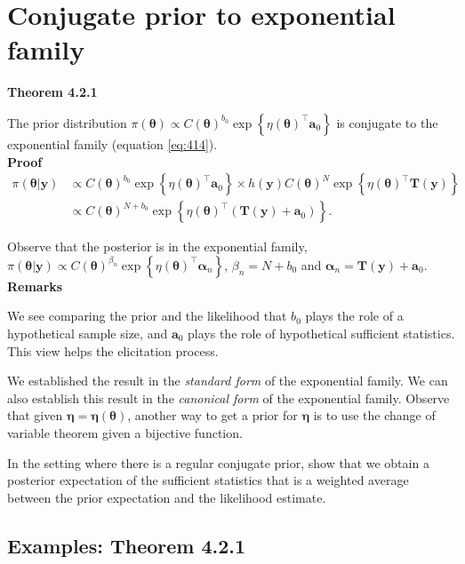 \section{Conjugate prior to exponential family}\label{sec42}

\textbf{Theorem 4.2.1}

The prior distribution $\pi(\bm{\theta})\propto C(\bm{\theta})^{b_0}\exp\left\{\eta(\bm{\theta})^{\top}\mathbf{a}_0\right\}$ is conjugate to the exponential family (equation \ref{eq:414}).\\

\textbf{Proof}
\begin{align}
	\pi(\bm{\theta}|\mathbf{y})& \propto C(\bm{\theta})^{b_0}\exp\left\{\eta(\bm{\theta})^{\top}\mathbf{a}_0\right\} \times h(\mathbf{y}) C(\bm{\theta})^N\exp\left\{\eta(\bm{\theta})^{\top}\mathbf{T}(\mathbf{y})\right\}\nonumber\\
	& \propto C(\bm{\theta})^{N+b_0} \exp\left\{\eta(\bm{\theta})^{\top}(\mathbf{T}(\mathbf{y})+\mathbf{a}_0)\right\}.\nonumber 
\end{align}

Observe that the posterior is in the exponential family, $\pi(\bm{\theta}|\mathbf{y})\propto C(\bm{\theta})^{\beta_n} \exp\left\{\eta(\bm{\theta})^{\top}\mathbf{\alpha}_n\right\}$, $\beta_n=N+b_0$ and $\mathbf{\alpha}_n=\mathbf{T}(\mathbf{y})+\mathbf{a}_0$.\\

\textbf{Remarks}

We see comparing the prior and the likelihood that $b_0$ plays the role of a hypothetical sample size, and $\mathbf{a}_0$ plays the role of hypothetical sufficient statistics. This view helps the elicitation process.

We established the result in the \textit{standard form} of the exponential family. We can also establish this result in the \textit{canonical form} of the exponential family. Observe that given $\bm{\eta}=\bm{\eta}(\bm{\theta})$, another way to get a prior for $\bm{\eta}$ is to use the change of variable theorem given a bijective function.

In the setting where there is a regular conjugate prior, \cite{diaconis1979conjugate} show that we obtain a posterior expectation of the sufficient statistics that is a weighted average between the prior expectation and the likelihood estimate. 

\subsection{Examples: Theorem 4.2.1}\label{sec421}

